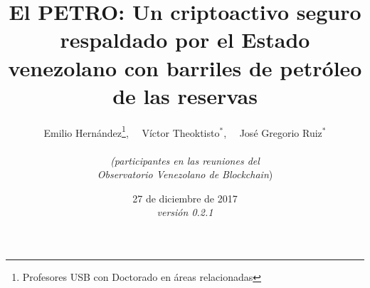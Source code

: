 \documentclass[spanish,letterpaper,11pt]{article}
\title{\bf El  PETRO: Un criptoactivo seguro respaldado por el
Estado venezolano con barriles de petróleo de las reservas}
\author{
	Emilio Hernández\thanks{Profesores USB con Doctorado en áreas relacionadas}, ~~Víctor Theoktisto$^*$, ~~José Gregorio Ruiz$^*$%
	\\~
    \\ \textit{(participantes en las reuniones del}
    \\ \textit{Observatorio Venezolano de Blockchain})%
}
\date{27 de diciembre de 2017 \\{%
\emph{versión 0.2.1}%
}%
}
\begin{document}
%
%
\maketitle
%
\begin{abstract}
%

%
\end{abstract}
%
%
\tableofcontents
%
%










\renewcommand{\appendixname}{Anexos}

\begin{appendices} %




%

\end{appendices}
\end{document}

